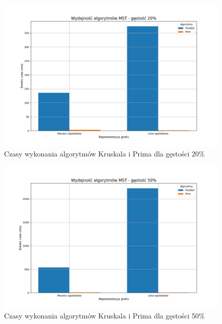 \documentclass{article}
\begin{document}
\begin{figure}[H]
    \centering
    \includegraphics[scale=0.5]{../Python/charts_type2/Typ2_MST_gestosc20_wykres.png}
    \caption{Czasy wykonania algorytmów Kruskala i Prima dla gęstości 20\%}
\end{figure}
\begin{figure}[H]
    \centering
    \includegraphics[scale=0.5]{../Python/charts_type2/Typ2_MST_gestosc50_wykres.png}
    \caption{Czasy wykonania algorytmów Kruskala i Prima dla gęstości 50\%}
\end{figure}
\end{document}
